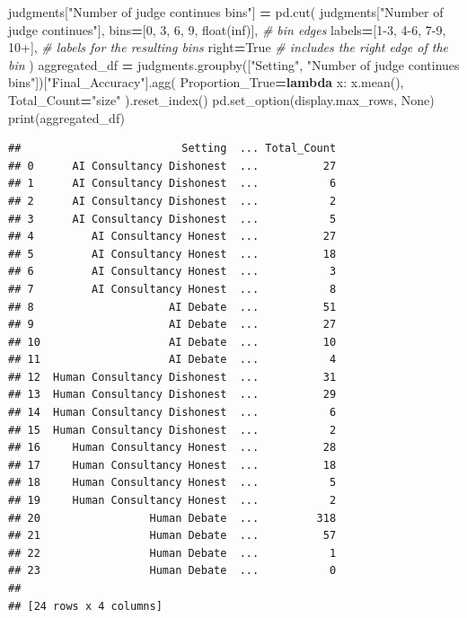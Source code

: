 \documentclass[
]{article}
\newenvironment{Shaded}{\begin{snugshade}}{\end{snugshade}}
\newcommand{\BuiltInTok}[1]{#1}
\newcommand{\CommentTok}[1]{\textcolor[rgb]{0.56,0.35,0.01}{\textit{#1}}}
\newcommand{\DecValTok}[1]{\textcolor[rgb]{0.00,0.00,0.81}{#1}}
\newcommand{\KeywordTok}[1]{\textcolor[rgb]{0.13,0.29,0.53}{\textbf{#1}}}
\newcommand{\NormalTok}[1]{#1}
\newcommand{\OperatorTok}[1]{\textcolor[rgb]{0.81,0.36,0.00}{\textbf{#1}}}
\newcommand{\StringTok}[1]{\textcolor[rgb]{0.31,0.60,0.02}{#1}}
\newcommand{\VariableTok}[1]{\textcolor[rgb]{0.00,0.00,0.00}{#1}}
\begin{document}
\begin{Shaded}
\begin{Highlighting}[]
\NormalTok{judgments[}\StringTok{"Number of judge continues bins"}\NormalTok{] }\OperatorTok{=}\NormalTok{ pd.cut(}
\NormalTok{    judgments[}\StringTok{"Number of judge continues"}\NormalTok{], }
\NormalTok{    bins}\OperatorTok{=}\NormalTok{[}\DecValTok{0}\NormalTok{, }\DecValTok{3}\NormalTok{, }\DecValTok{6}\NormalTok{, }\DecValTok{9}\NormalTok{, }\BuiltInTok{float}\NormalTok{(}\StringTok{\textquotesingle{}inf\textquotesingle{}}\NormalTok{)],  }\CommentTok{\# bin edges}
\NormalTok{    labels}\OperatorTok{=}\NormalTok{[}\StringTok{\textquotesingle{}1{-}3\textquotesingle{}}\NormalTok{, }\StringTok{\textquotesingle{}4{-}6\textquotesingle{}}\NormalTok{, }\StringTok{\textquotesingle{}7{-}9\textquotesingle{}}\NormalTok{, }\StringTok{\textquotesingle{}10+\textquotesingle{}}\NormalTok{],  }\CommentTok{\# labels for the resulting bins}
\NormalTok{    right}\OperatorTok{=}\VariableTok{True}  \CommentTok{\# includes the right edge of the bin}
\NormalTok{)}
\NormalTok{aggregated\_df }\OperatorTok{=}\NormalTok{ judgments.groupby([}\StringTok{"Setting"}\NormalTok{, }\StringTok{"Number of judge continues bins"}\NormalTok{])[}\StringTok{"Final\_Accuracy"}\NormalTok{].agg(}
\NormalTok{    Proportion\_True}\OperatorTok{=}\KeywordTok{lambda}\NormalTok{ x: x.mean(),}
\NormalTok{    Total\_Count}\OperatorTok{=}\StringTok{"size"}
\NormalTok{).reset\_index()}
\NormalTok{pd.set\_option(}\StringTok{\textquotesingle{}display.max\_rows\textquotesingle{}}\NormalTok{, }\VariableTok{None}\NormalTok{)}
\BuiltInTok{print}\NormalTok{(aggregated\_df)}
\end{Highlighting}
\end{Shaded}

\begin{verbatim}
##                         Setting  ... Total_Count
## 0      AI Consultancy Dishonest  ...          27
## 1      AI Consultancy Dishonest  ...           6
## 2      AI Consultancy Dishonest  ...           2
## 3      AI Consultancy Dishonest  ...           5
## 4         AI Consultancy Honest  ...          27
## 5         AI Consultancy Honest  ...          18
## 6         AI Consultancy Honest  ...           3
## 7         AI Consultancy Honest  ...           8
## 8                     AI Debate  ...          51
## 9                     AI Debate  ...          27
## 10                    AI Debate  ...          10
## 11                    AI Debate  ...           4
## 12  Human Consultancy Dishonest  ...          31
## 13  Human Consultancy Dishonest  ...          29
## 14  Human Consultancy Dishonest  ...           6
## 15  Human Consultancy Dishonest  ...           2
## 16     Human Consultancy Honest  ...          28
## 17     Human Consultancy Honest  ...          18
## 18     Human Consultancy Honest  ...           5
## 19     Human Consultancy Honest  ...           2
## 20                 Human Debate  ...         318
## 21                 Human Debate  ...          57
## 22                 Human Debate  ...           1
## 23                 Human Debate  ...           0
## 
## [24 rows x 4 columns]
\end{verbatim}
\end{document}
